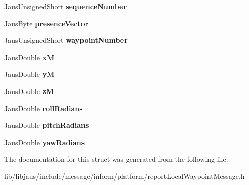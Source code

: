 \begin{DoxyCompactItemize}
\item 
\hypertarget{struct_report_local_waypoint_message_struct_a1050927606b8ab6e072ae9bec8c70453}{\-Jaus\-Unsigned\-Short {\bfseries sequence\-Number}}\label{struct_report_local_waypoint_message_struct_a1050927606b8ab6e072ae9bec8c70453}

\item 
\hypertarget{struct_report_local_waypoint_message_struct_a15af6588d6aa2986f1d86613ba49b678}{\-Jaus\-Byte {\bfseries presence\-Vector}}\label{struct_report_local_waypoint_message_struct_a15af6588d6aa2986f1d86613ba49b678}

\item 
\hypertarget{struct_report_local_waypoint_message_struct_a06e455d9f2d77d544d5779f560611fb6}{\-Jaus\-Unsigned\-Short {\bfseries waypoint\-Number}}\label{struct_report_local_waypoint_message_struct_a06e455d9f2d77d544d5779f560611fb6}

\item 
\hypertarget{struct_report_local_waypoint_message_struct_aac8330edcd63c536fea6c819fd5ede30}{\-Jaus\-Double {\bfseries x\-M}}\label{struct_report_local_waypoint_message_struct_aac8330edcd63c536fea6c819fd5ede30}

\item 
\hypertarget{struct_report_local_waypoint_message_struct_afd0eecc8084221ddb8d1f2c3c6647e30}{\-Jaus\-Double {\bfseries y\-M}}\label{struct_report_local_waypoint_message_struct_afd0eecc8084221ddb8d1f2c3c6647e30}

\item 
\hypertarget{struct_report_local_waypoint_message_struct_a9934be2bb58942e99b44db2f13487c33}{\-Jaus\-Double {\bfseries z\-M}}\label{struct_report_local_waypoint_message_struct_a9934be2bb58942e99b44db2f13487c33}

\item 
\hypertarget{struct_report_local_waypoint_message_struct_a964241b34b43a87eb2095a6815267ccb}{\-Jaus\-Double {\bfseries roll\-Radians}}\label{struct_report_local_waypoint_message_struct_a964241b34b43a87eb2095a6815267ccb}

\item 
\hypertarget{struct_report_local_waypoint_message_struct_a8f6dc5e12528949ae9f8bf18ffea75b1}{\-Jaus\-Double {\bfseries pitch\-Radians}}\label{struct_report_local_waypoint_message_struct_a8f6dc5e12528949ae9f8bf18ffea75b1}

\item 
\hypertarget{struct_report_local_waypoint_message_struct_ad1c530e564572498c549769ce311fcc8}{\-Jaus\-Double {\bfseries yaw\-Radians}}\label{struct_report_local_waypoint_message_struct_ad1c530e564572498c549769ce311fcc8}

\end{DoxyCompactItemize}


\-The documentation for this struct was generated from the following file\-:\begin{DoxyCompactItemize}
\item 
lib/libjaus/include/message/inform/platform/report\-Local\-Waypoint\-Message.\-h\end{DoxyCompactItemize}
